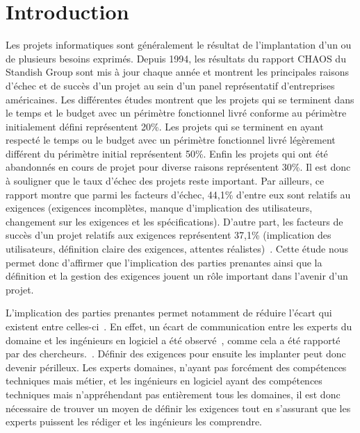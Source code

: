 \chapter*{Introduction}
\label{chap:introduction}

Les projets informatiques sont généralement le résultat de l'implantation d'un ou de plusieurs besoins exprimés. Depuis 1994, les résultats du rapport CHAOS du Standish Group sont mis à jour chaque année et montrent les principales raisons d’échec et de succès d’un projet au sein d’un panel représentatif d’entreprises américaines. Les différentes études montrent que les projets qui se terminent dans le temps et le budget avec un périmètre fonctionnel livré conforme au périmètre initialement défini représentent 20\%. Les projets qui se terminent en ayant respecté le temps ou le budget avec un périmètre fonctionnel livré légèrement différent  du périmètre initial représentent 50\%. Enfin les projets qui ont été abandonnés en cours de projet pour diverse raisons représentent 30\%. Il est donc à souligner que le taux d’échec des projets reste important. Par ailleurs, ce rapport montre que parmi les facteurs d'échec, 44,1\% d'entre eux sont relatifs au exigences (exigences incomplètes, manque d'implication des utilisateurs, changement sur les exigences et les spécifications). D'autre part, les facteurs de succès d'un projet relatifs aux exigences représentent 37,1\% (implication des utilisateurs, définition claire des exigences, attentes réalistes)~\cite{livre1}.
Cette étude nous permet donc d’affirmer que l’implication des parties prenantes ainsi que la définition et la gestion des exigences jouent un rôle important dans l’avenir d’un projet.

L'implication des parties prenantes permet notamment de réduire l'écart qui existent entre celles-ci~\cite{article5}. En effet, un écart de communication entre les experts du domaine et les ingénieurs en logiciel a été observé~\cite{article1}, comme cela a été rapporté par des chercheurs.~\cite{article2}. Définir des exigences pour ensuite les implanter peut donc devenir périlleux. Les experts domaines, n'ayant pas forcément des compétences techniques mais métier, et les ingénieurs en logiciel ayant des compétences techniques mais n'appréhendant pas entièrement tous les domaines, il est donc nécessaire de trouver un moyen de définir les exigences tout en s'assurant que les experts puissent les rédiger et les ingénieurs les comprendre. 

